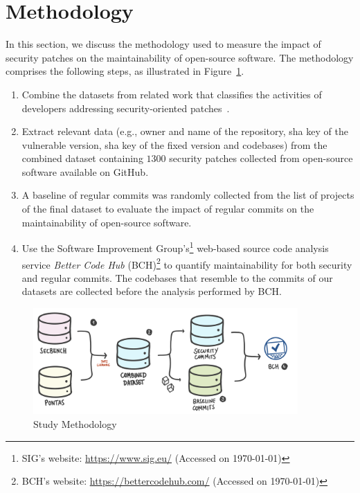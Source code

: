 \documentclass[smallextended]{svjour3}       %
\begin{document}
\section{Methodology}\label{sec:methodology}
%

In this section, we discuss the methodology used to measure
the impact of security patches on the maintainability of open-source
software. The methodology comprises the following steps, as 
illustrated in Figure~\ref{fig:met}.
%
\begin{enumerate}
	\item Combine the datasets from related work that classifies
	the activities of developers addressing security-oriented 
	patches~\cite{Reis:2017:IJSSE,10.1109/MSR.2019.00064}.
%
	\item
	Extract relevant data (e.g., owner and name of
	the repository, sha key of the vulnerable version, sha key of 	
	the fixed version and codebases) from the combined dataset 	
	containing $1300$ security patches collected from open-source 	
	software available on GitHub.
%
	\item A baseline of regular commits was randomly collected from 
	the list of projects of the final dataset to evaluate the impact 
	of regular commits on the maintainability of open-source 
	software.
%
  \item Use the Software Improvement Group's\footnote{SIG's website: 
  \url{https://www.sig.eu/} (Accessed on \today{})} web-based source 
  code analysis service \emph{Better Code Hub} (BCH)\footnote{BCH's 
  website: \url{https://bettercodehub.com/} (Accessed on \today{})} 
  to quantify maintainability for both security and regular commits. 
  The codebases that resemble to the commits of our datasets are 
  collected before the analysis performed by BCH.
\end{enumerate}
%
\begin{figure}[h]
	\centering 	
    \begin{adjustwidth}{0.5cm}{-1cm}  
	\includegraphics[width=0.9\textwidth]{figures/methodology.pdf}
 	\caption{Study Methodology}
	\label{fig:met}
	 \end{adjustwidth}
\end{figure}
%
\end{document}
